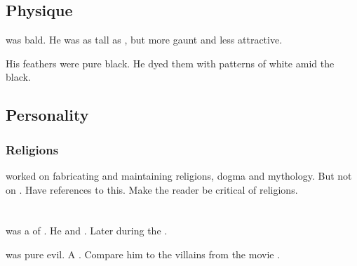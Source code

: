 \subsection{Physique}
\Menessiaraid{} was bald. 
He was as tall as \Teshrial, but more gaunt and less attractive. 

His feathers were pure black.
He dyed them with patterns of white amid the black. 









\subsection{Personality}





\subsubsection{Religions}
\Menessiaraid worked on fabricating and maintaining religions, dogma and mythology. 
But not on \Azmith. 
Have references to this. 
Make the reader be critical of religions. 















\section{\Morcariel}
\index{\Morcariel}
\Morcariel was a \sathariah \resphan of \CiriathSepher. 
He  and . 
Later  during the .

\Morcariel was pure evil. 
A . 
Compare him to the villains from the movie \cite{Movie:Avatar}. 















